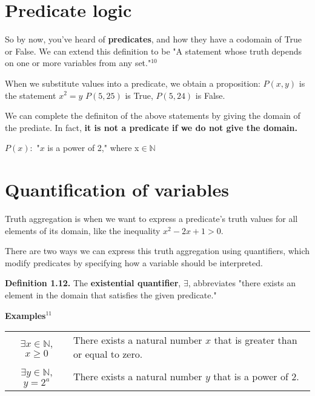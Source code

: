 \documentclass{article}
\begin{document}
\newpage
\section{Predicate logic}
So by now, you've heard of \textbf{predicates}, and how they have a codomain of True or False. 
We can extend this definition to be "A statement whose truth depends on one or
more variables from any set."$^10$

When we substitute values into a predicate, we obtain a proposition:
$P(x, y) $ is the statement $x^2 = y$ \hfill $P(5, 25)$ is True, $P(5, 24)$ is False.

We can complete the definiton of the above statements by giving the domain
of the prediate. In fact, \textbf{it is not a predicate if we do not give the domain.}

\begin{center}
$ P(x) : $ "$x$ is a power of 2," \quad where x$ \in \mathbb{N} $
\end{center}

\section{Quantification of variables}
Truth aggregation is when we want to express a predicate's truth values for
all elements of its domain, like the inequality $x^2 - 2x + 1 > 0$. 

There are two ways we can express this truth aggregation using quantifiers, 
which modify predicates by specifying how a variable should be interpreted.

\textbf{Definition 1.12.} The \textbf{existential quantifier}, $\exists$, 
abbreviates "there exists an element in the domain that satisfies the
given predicate." 

\textbf{Examples$^{11}$}
\begin{center}
\begin{tabular}{|c p{7.54cm}|}
    $\exists x \in \mathbb{N}$, $x \geq 0$ & There exists a natural number
    $x$ that is greater than or equal to zero. \\
    $\exists y \in \mathbb{N}$, $y = 2^a$  & There exists a natural number 
    $y$ that is a power of 2.
\end{tabular}
\end{center}
\end{document}
